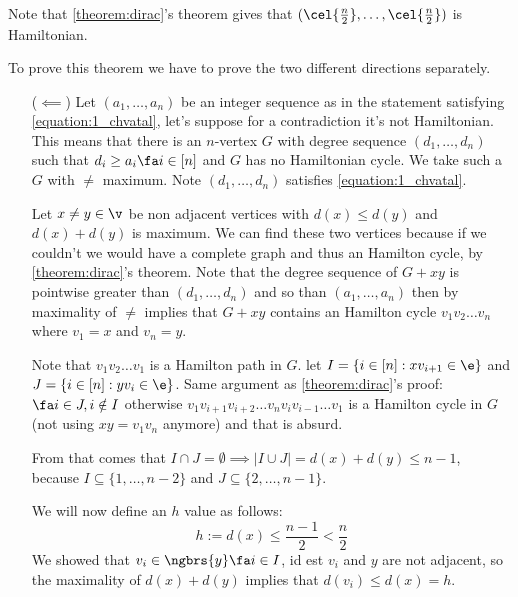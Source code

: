 Note that \ref{theorem:dirac}'s theorem gives that $(\cel{\frac{n}{2}}, \dots, \cel{\frac{n}{2}})$ is Hamiltonian.
\begin{prf}
    To prove this theorem we have to prove the two different directions separately.
    \begin{itemize}
        \item [($\impliedby$)] Let $(a_1, \dots, a_n)$ be an integer sequence as in the statement satisfying \ref{equation:1_chvatal}, let's suppose for a contradiction it's not Hamiltonian. This means that there is an $n$-vertex $G$ with degree sequence $(d_1, \dots, d_n)$ such that $d_i \geq a_i \fa i \in [n]$ and $G$ has no Hamiltonian cycle. We take such a $G$ with $\ne$ maximum. Note $(d_1, \dots, d_n)$ satisfies \ref{equation:1_chvatal}.
        
        Let $x \neq y \in \v$ be non adjacent vertices with $d(x) \leq d(y)$ and $d(x) + d(y)$ is maximum. We can find these two vertices because if we couldn't we would have a complete graph and thus an Hamilton cycle, by \ref{theorem:dirac}'s theorem. Note that the degree sequence of $G + xy$ is pointwise greater than $(d_1, \dots, d_n)$ and so than $(a_1, \dots, a_n)$ then by maximality of $\ne$ implies that $G + xy$ contains an Hamilton cycle $v_1v_2 \dots v_n$ where $v_1 = x$ and $v_n = y$.

        Note that $v_1v_2 \dots v_1$  is a Hamilton path in $G$. let $I = \{i \in [n]: xv_{i + 1} \in \e\}$ and $J = \{i \in [n]: yv_i \in \e\}$. Same argument as \ref{theorem:dirac}'s proof: $\fa i \in J, i \notin I$ otherwise $v_1 v_{i + 1} v_{i + 2} \dots v_n v_i v_{i - 1} \dots v_1$ is a Hamilton cycle in $G$ (not using $xy = v_1v_n$ anymore) and that is absurd.

        From that comes that $I \cap J = \emptyset \implies |I \cup J| = d(x) + d(y) \leq n - 1$, because $I \subseteq \{1, \dots, n - 2\}$ and $J \subseteq \{2, \dots, n - 1\}$.

        We will now define an $h$ value as follows:
        \begin{equation*}
            h := d(x) \leq \frac{n - 1}{2} < \frac{n}{2}
        \end{equation*}
        We showed that $v_i \in \ngbrs{y} \fa i \in I$, id est $v_i$ and $y$ are not adjacent, so the maximality of $d(x) + d(y)$ implies that $d(v_i) \leq d(x) = h$.


\end{itemize}
\end{prf}
